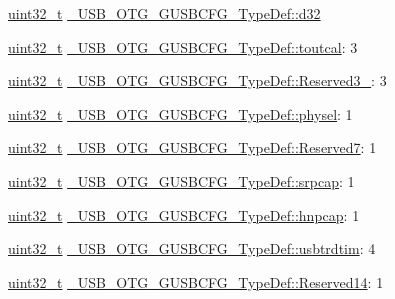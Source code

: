 \begin{DoxyCompactItemize}
\begin{tabbing}
\end{tabbing}\item 
\hyperlink{stdint_8h_a435d1572bf3f880d55459d9805097f62}{uint32\-\_\-t} \hyperlink{group___u_s_b___o_t_g___d_r_i_v_e_r_ga229098d7378c0af0ab0e164ea05b0e61}{\-\_\-\-U\-S\-B\-\_\-\-O\-T\-G\-\_\-\-G\-U\-S\-B\-C\-F\-G\-\_\-\-Type\-Def\-::d32}
\item 
\hyperlink{stdint_8h_a435d1572bf3f880d55459d9805097f62}{uint32\-\_\-t} \hyperlink{group___u_s_b___o_t_g___d_r_i_v_e_r_ga5ff2c9d380b6cf9797c300917954d000}{\-\_\-\-U\-S\-B\-\_\-\-O\-T\-G\-\_\-\-G\-U\-S\-B\-C\-F\-G\-\_\-\-Type\-Def\-::toutcal}\-: 3
\item 
\hyperlink{stdint_8h_a435d1572bf3f880d55459d9805097f62}{uint32\-\_\-t} \hyperlink{group___u_s_b___o_t_g___d_r_i_v_e_r_gaaac4ee1a7a9421a2b6475a1696cb4746}{\-\_\-\-U\-S\-B\-\_\-\-O\-T\-G\-\_\-\-G\-U\-S\-B\-C\-F\-G\-\_\-\-Type\-Def\-::\-Reserved3\-\_}\-: 3
\item 
\hyperlink{stdint_8h_a435d1572bf3f880d55459d9805097f62}{uint32\-\_\-t} \hyperlink{group___u_s_b___o_t_g___d_r_i_v_e_r_gaef0dede35984b2d149038b79a2baed90}{\-\_\-\-U\-S\-B\-\_\-\-O\-T\-G\-\_\-\-G\-U\-S\-B\-C\-F\-G\-\_\-\-Type\-Def\-::physel}\-: 1
\item 
\hyperlink{stdint_8h_a435d1572bf3f880d55459d9805097f62}{uint32\-\_\-t} \hyperlink{group___u_s_b___o_t_g___d_r_i_v_e_r_ga2c2590959125d7af13b63cdc8ade7955}{\-\_\-\-U\-S\-B\-\_\-\-O\-T\-G\-\_\-\-G\-U\-S\-B\-C\-F\-G\-\_\-\-Type\-Def\-::\-Reserved7}\-: 1
\item 
\hyperlink{stdint_8h_a435d1572bf3f880d55459d9805097f62}{uint32\-\_\-t} \hyperlink{group___u_s_b___o_t_g___d_r_i_v_e_r_gaeaeeae32b3c77bc22a522fc15bb74658}{\-\_\-\-U\-S\-B\-\_\-\-O\-T\-G\-\_\-\-G\-U\-S\-B\-C\-F\-G\-\_\-\-Type\-Def\-::srpcap}\-: 1
\item 
\hyperlink{stdint_8h_a435d1572bf3f880d55459d9805097f62}{uint32\-\_\-t} \hyperlink{group___u_s_b___o_t_g___d_r_i_v_e_r_gad727873756c868d916c2f2bec5f57dd8}{\-\_\-\-U\-S\-B\-\_\-\-O\-T\-G\-\_\-\-G\-U\-S\-B\-C\-F\-G\-\_\-\-Type\-Def\-::hnpcap}\-: 1
\item 
\hyperlink{stdint_8h_a435d1572bf3f880d55459d9805097f62}{uint32\-\_\-t} \hyperlink{group___u_s_b___o_t_g___d_r_i_v_e_r_gabf63456dfc37163f24032f4315bf5422}{\-\_\-\-U\-S\-B\-\_\-\-O\-T\-G\-\_\-\-G\-U\-S\-B\-C\-F\-G\-\_\-\-Type\-Def\-::usbtrdtim}\-: 4
\item 
\hyperlink{stdint_8h_a435d1572bf3f880d55459d9805097f62}{uint32\-\_\-t} \hyperlink{group___u_s_b___o_t_g___d_r_i_v_e_r_gad90fd2d32cf23ca2f2b1edb8139de1a0}{\-\_\-\-U\-S\-B\-\_\-\-O\-T\-G\-\_\-\-G\-U\-S\-B\-C\-F\-G\-\_\-\-Type\-Def\-::\-Reserved14}\-: 1

\end{DoxyCompactItemize}
